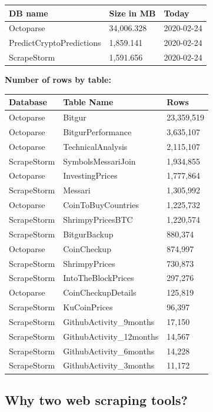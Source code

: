 \documentclass[
]{book}
\begin{document}
\begin{tabular}{l|l|l}
\hline
DB name & Size in MB & Today\\
\hline
Octoparse & 34,006.328 & 2020-02-24\\
\hline
PredictCryptoPredictions & 1,859.141 & 2020-02-24\\
\hline
ScrapeStorm & 1,591.656 & 2020-02-24\\
\hline
\end{tabular}

\textbf{Number of rows by table:}

\begin{tabular}{l|l|l}
\hline
Database & Table Name & Rows\\
\hline
Octoparse & Bitgur & 23,359,519\\
\hline
Octoparse & BitgurPerformance & 3,635,107\\
\hline
Octoparse & TechnicalAnalysis & 2,115,107\\
\hline
ScrapeStorm & SymbolsMessariJoin & 1,934,855\\
\hline
Octoparse & InvestingPrices & 1,777,864\\
\hline
ScrapeStorm & Messari & 1,305,992\\
\hline
Octoparse & CoinToBuyCountries & 1,225,732\\
\hline
ScrapeStorm & ShrimpyPricesBTC & 1,220,574\\
\hline
ScrapeStorm & BitgurBackup & 880,374\\
\hline
Octoparse & CoinCheckup & 874,997\\
\hline
ScrapeStorm & ShrimpyPrices & 730,873\\
\hline
ScrapeStorm & IntoTheBlockPrices & 297,276\\
\hline
Octoparse & CoinCheckupDetails & 125,819\\
\hline
ScrapeStorm & KuCoinPrices & 96,397\\
\hline
ScrapeStorm & GithubActivity\_9months & 17,150\\
\hline
ScrapeStorm & GithubActivity\_12months & 14,567\\
\hline
ScrapeStorm & GithubActivity\_6months & 14,228\\
\hline
ScrapeStorm & GithubActivity\_3months & 11,172\\
\hline
\end{tabular}

\hypertarget{why-two-web-scraping-tools}{%
\subsection{Why two web scraping tools?}\label{why-two-web-scraping-tools}}
\end{document}
